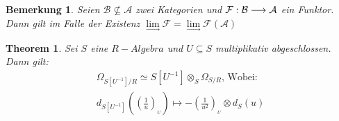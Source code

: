\documentclass[10pt,a4paper]{report}
\newcommand{\comment}[1]{}
\newcounter{Aussage}[chapter]
\newtheorem{theorem}[Aussage]{Theorem}
\newtheorem{bem}[Aussage]{Bemerkung}
\newcommand{\functionfront}[3]{\nolinebreak{#1:#2 \longrightarrow #3}}
\newcommand{\divR}[2]{\Omega_{#1/#2}}
\newcommand{\Tensor}[3]{#1 \otimes_{#2} #3}
\newcommand{\tensor}[3]{#1 \otimes #3}
\newcommand{\lok}[2]{#1 [#2^{-1}]}
\newcommand{\loke}[3]{(\frac{#1}{#2})_{_#3}}
\newcommand{\colimes}[0]{\lim\limits_{ \longrightarrow }}
\begin{document}
\begin{bem}\label{Vereinfachung des Kolimes}
Seien $\mathcal{B} \nsubseteq \mathcal{A}$ zwei Kategorien und $\functionfront{\mathcal{F}}{\mathcal{B}}{\mathcal{A}}$ ein Funktor.\\
Dann gilt im Falle der Existenz $\colimes \mathcal{F} = \colimes \mathcal{F}(\mathcal{A})$ 
\end{bem}


\begin{theorem}\comment{\label{Lokalisierung des Kähler-Differenzials}}
Sei $S$ eine $R-Algebra$ und $U \subseteq S$ multiplikativ abgeschlossen.
Dann gilt:
\begin{gather*}
\divR{\lok{S}{U}}{R} \simeq \Tensor{\lok{S}{U}}{S}{\divR{S}{R}} \text{, Wobei:}\\
 d_{\lok{S}{U}}(\loke{1}{u}{U}) \longmapsto -\tensor{\loke{1}{u^2}{U}}{S}{d_S(u)}
\end{gather*}
\end{theorem}
\end{document}
